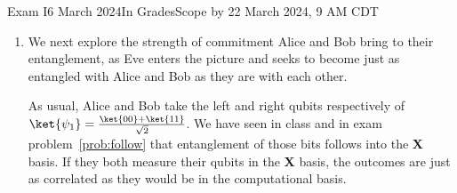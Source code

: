\documentclass[12pt]{article}
\newcommand{\Blank}[1][1in]{\mbox{\vrule width #1 depth 2pt}\vrule width 0pt height 2.0em}
\def\Bell{%
\BellTwo{00}{11}}
\def\BellTwo#1#2{%
\BellTwoSign{#1}{#2}{+}}
\def\BellTwoSign#1#2#3{%
\ensuremath{\frac{\ket{#1} #3 \ket{#2}}{\sqrt{2}}}}
\def\BellM{\BellTwoSign{01}{10}{-}}
\begin{document}
\begin{assignment}{Exam I}{6 March 2024}{In GradesScope by 22 March 2024, 9 AM CDT}
\begin{enumerate}
In \texttt{bellstatepersists.txt} we define the gate \[U = \begin{pmatrix*}[r] a & b \\ c & d\end{pmatrix*}\]
with $a, b, c, d$ all real-valued, to make matters
simple.  You can keep those values real for the rest of this problem as well.
\Continued{}
With \texttt{Matlab} as your (perhaps recent) faithful friend, complete the equation below to show what happens if Alice and Bob each apply $U$ (as defined above) to  (be sure to represent the sign on  properly for ):
\[
\ket{\psi_{2}} = (U\otimes U)\ket{\psi_{1}} = \frac{1}{\sqrt{2}}\begin{pmatrix*}[r]
\Blank[3em]{} \\
\Blank[7em]{} \\
\Blank[7em]{} \\
\Blank[3em]{} 
\end{pmatrix*}
\]

Here is a useful fact (mention this in passing at your next social gathering):  
\[ \mbox{If $U$ is unitary then }\left|\mbox{det}(U)\right| =  1 \]

That is, the determinant of a unitary matrix has magnitude~$1$.

Equipped with, aware of, and fascinated by that useful fact, prove that
\[ \ket{\psi_{2}} \equiv \BellM{}\]
In other words, Alice and Bob can apply $U$ to this other Bell state  and they still have (up to a global phase) state .  

Your proof below:
\LeaveSpace{2in}
If Alice and Bob begin in state , does that entanglement follow them into , after any unitary~$U$ is applied to each qubit, so that their measurements consistently and perfectly disagree?\Blank{}
\clearpage\item{}
We next explore the strength of commitment Alice and Bob bring to their
entanglement, as Eve enters the picture and seeks to become just as entangled
with Alice and Bob as they are with each other.

As usual, Alice and Bob take the left and right qubits respectively of $\ket{\psi_{1}}=\Bell{}$.
We have seen in class and in exam problem~\ref{prob:follow} that entanglement of those bits follows into the 
\textbf{X} basis.  If they both measure their qubits in the \textbf{X} basis,
the outcomes are just as correlated as they would be in the computational
basis.


\end{enumerate}
\end{assignment}
\end{document}
